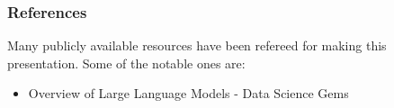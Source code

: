 \begin{frame}\frametitle{References}
Many publicly available resources have been refereed for making this presentation. Some of the notable ones are:
\footnotesize
\begin{itemize}
\item Overview of Large Language Models - Data Science Gems
\end{itemize}
\end{frame}
